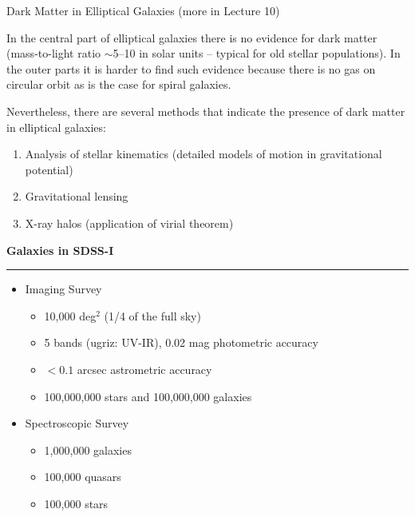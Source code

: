 \documentclass[letterpaper,landscape]{slides}
\begin{document}

\begin{slide}
\begin{center}
{\large \color{red} 
                         Dark Matter in Elliptical Galaxies   (more in Lecture 10)   }
\end{center}

In the central part of elliptical galaxies there is no evidence for 
dark matter (mass-to-light ratio $\sim$5--10 in solar units -- typical
for old stellar populations). In the outer parts it is harder to 
find such evidence because there is no gas on circular orbit as is
the case for spiral galaxies.

Nevertheless, there are several methods that indicate {\color{blue}  the presence
of dark matter in elliptical galaxies:}
\begin{enumerate}
\item Analysis of stellar kinematics (detailed models of motion in 
    gravitational potential)
\item Gravitational lensing
\item X-ray halos (application of virial theorem)
\end{enumerate}


\vfill
\end{slide}








\begin{slide}

\begin{center}
\bfseries
{\color{red} \large Galaxies in SDSS-I}
\end{center}
 \vskip 0.2in
\hrule

\begin{itemize}
\item
{\color{red}Imaging Survey}
   \begin{itemize}
   \item 10,000 deg$^2$ (1/4 of the full sky)
   \item 5 bands (ugriz: UV-IR), 0.02 mag photometric accuracy
   \item $<0.1$ arcsec astrometric accuracy
   \item 100,000,000 stars and 100,000,000 galaxies
   \end{itemize}

\item
{\color{red}Spectroscopic Survey}
   \begin{itemize}
   \item 1,000,000 galaxies
   \item 100,000 quasars
   \item 100,000 stars
   \end{itemize}

\end{itemize}
\end{slide}
 
\end{document}
